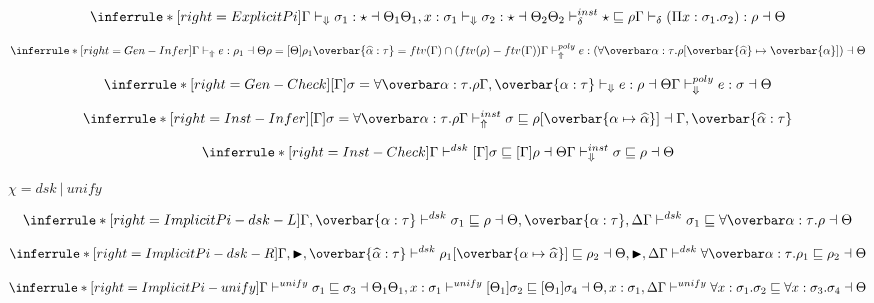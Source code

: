 \[
\inferrule*[right=ExplicitPi]
{\checktype \sigma_1 : \star \dashv \Theta_1 \\
\Theta_1, x:\sigma_1 \checktypeno \sigma_2 : \star \dashv \Theta_2 \\
\Theta_2 \instinfercheck \star \sqsubseteq \rho
}
{\infercheck (\Pi x : \sigma_1. \sigma_2) : \rho \dashv \Theta}
\]


\[
\inferrule*[right=Gen-Infer]
{\infertype e :\rho_1 \dashv \Theta\\
\rho = [\Theta]\rho_1 \\
\overbar{\widehat \alpha:\tau}=ftv(\Gamma) \cap (ftv(\rho)-ftv(\Gamma))
}
{\polyinfer e :(\forallvars{\alpha:\tau}. \rho[\overbar{\widehat \alpha} \mapsto \overbar{\alpha}]) \dashv \Theta}
\]

\[
\inferrule*[right=Gen-Check]
{
[\Gamma]\sigma = \forallvars{\alpha:\tau}. \rho \\
\Gamma, \overbar{\alpha:\tau} \checktypeno e :\rho \dashv \Theta
}
{\polycheck e : \sigma \dashv \Theta}
\]

\framebox{$ \Gamma \instinfercheck \sigma \sqsubseteq \rho$ }

\[
\inferrule*[right=Inst-Infer]
{[\Gamma] \sigma = \forallvars{\alpha:\tau}. \rho
}
{\Gamma \instinfer \sigma \sqsubseteq \rho[\overbar{\tpmapsto {\tau} \alpha {\widehat{\alpha}}}] \dashv \Gamma, \overbar{\widehat{\alpha}:\tau}}
\]

\[
\inferrule*[right=Inst-Check]
{\Gamma \polymorphic [\Gamma]\sigma \sqsubseteq [\Gamma]\rho \dashv \Theta} { \Gamma \instcheck \sigma \sqsubseteq \rho \dashv \Theta}
\]

\newcommand{\dskunify}[0]{\vdash^{\chi}}
\framebox{$ \Gamma \dskunify \sigma_1 \sqsubseteq \sigma_2$} $\chi = dsk~|~unify$

\[
\inferrule*[right=ImplicitPi-dsk-L]
{
\Gamma, \overbar{\alpha:\tau} \polymorphicstar \sigma_1 \sqsubseteq \rho \dashv \Theta, \overbar{\alpha:\tau}, \Delta}
{\Gamma \polymorphic \sigma_1 \sqsubseteq \forallvars{\alpha:\tau}. \rho \dashv \Theta}
\]

\[
\inferrule*[right=ImplicitPi-dsk-R]
{\Gamma , \blacktriangleright, \overbar{\widehat \alpha : \tau} \polymorphicstar \rho_1[\overbar{\tpmapsto \tau \alpha {\widehat \alpha}}] \sqsubseteq \rho_2 \dashv \Theta, \blacktriangleright, \Delta}
{\Gamma \polymorphicstar \forallvars{\alpha:\tau}.\rho_1 \sqsubseteq \rho_2 \dashv \Theta}
\]

\[
\inferrule*[right=ImplicitPi-unify]
{\Gamma \unify  \sigma_1 \sqsubseteq \sigma_3 \dashv \Theta_1 \\
\Theta_1, x:\sigma_1 \unify [\Theta_1]\sigma_2 \sqsubseteq [\Theta_1]\sigma_4 \dashv \Theta, x:\sigma_1, \Delta}
{ \Gamma \unify \forall x:\sigma_1. \sigma_2 \sqsubseteq \forall x:\sigma_3. \sigma_4 \dashv \Theta}
\]

